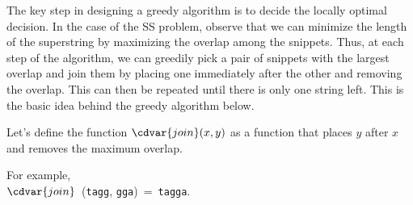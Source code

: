 \begin{gram}
The key step in designing a greedy algorithm is to decide the locally
optimal decision.
%
In the case of the SS problem, observe that we can minimize the length
of the superstring by maximizing the overlap among the snippets.
%
Thus, at each step of the algorithm, we can greedily pick a pair of
snippets with the largest overlap and join them by placing one
immediately after the other and removing the overlap.  
%
This can then be repeated until there is only one string left.
%
This is the basic idea behind the greedy algorithm below.
\end{gram}

\begin{gram}
Let's define the function $\cdvar{join}(x, y)$ as a function that
places $y$ after $x$ and removes the maximum overlap.
%

For example, 
\\
%
$\cdvar{join}$~(\texttt{tagg}, \texttt{gga})~=~\texttt{tagga}.
%
\end{gram}


